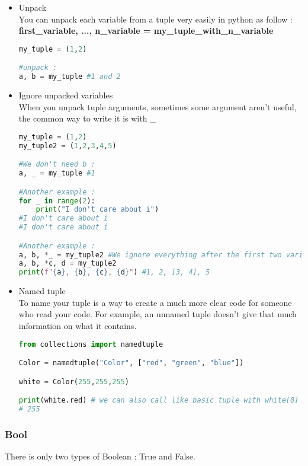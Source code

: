 \documentclass[a4paper, 12pt, titlepage]{scrartcl} %
\begin{document}
\begin{itemize}
\item Unpack \\
You can unpack each variable from a tuple very easily in python as follow : \textbf{first\_variable, ..., n\_variable = my\_tuple\_with\_n\_variable}

\begin{lstlisting}[language=Python]
my_tuple = (1,2)

#unpack :
a, b = my_tuple #1 and 2
\end{lstlisting} \vspace{5mm}

\item Ignore unpacked variables \\
When you unpack tuple arguments, sometimes some argument aren't useful, the common way to write it is with \_
\begin{lstlisting}[language=Python]
my_tuple = (1,2)
my_tuple2 = (1,2,3,4,5)

#We don't need b :
a, _ = my_tuple #1

#Another example :
for _ in range(2):
	print("I don't care about i")
#I don't care about i
#I don't care about i

#Another example :
a, b, *_ = my_tuple2 #We ignore everything after the first two variables, the rest is stored in a list.
a, b, *c, d = my_tuple2 
print(f"{a}, {b}, {c}, {d}") #1, 2, [3, 4], 5
\end{lstlisting} \vspace{5mm}

\item Named tuple \\
To name your tuple is a way to create a much more clear code for someone who read your code. For example, an unnamed tuple doesn't give that much information on what it contains.
\begin{lstlisting}[language=Python]
from collections import namedtuple

Color = namedtuple("Color", ["red", "green", "blue"])

white = Color(255,255,255)

print(white.red) # we can also call like basic tuple with white[0]
# 255
\end{lstlisting} \vspace{5mm}
\end{itemize}


\subsubsection{Bool}
\label{subsec:Bool}
There is only two types of Boolean : True and False. 
\end{document}
